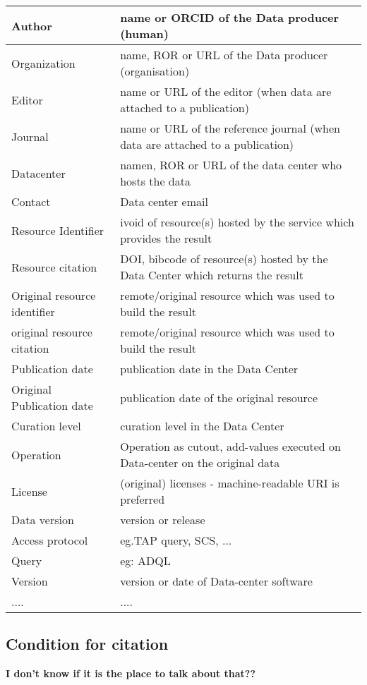 \documentclass[11pt,a4paper]{ivoa}
\begin{document}
\begin{tabular}{|l|p{}|} \hline
Author & name or ORCID of the Data producer (human)\\ \hline
Organization&  name, ROR or URL of the Data producer (organisation)\\ \hline
Editor & name or URL  of the editor (when data are attached to a publication)\\ \hline
Journal & name or URL of the reference journal (when data are attached to a publication)\\ \hline
Datacenter & namen, ROR or URL of the data center who hosts the data \\ \hline
Contact & Data center email \\ \hline

Resource Identifier & ivoid of resource(s) hosted by the service which provides the result \\ \hline
Resource citation & DOI, bibcode of resource(s) hosted by the Data Center which returns the result \\ \hline
Original resource identifier & remote/original resource which was used to build the result \\ \hline
original resource citation & remote/original resource which was used to build the result \\ \hline
Publication date & publication date in the Data Center \\ \hline
Original Publication date &  publication date of the original resource \\ \hline
Curation level & curation level in the Data Center \\ \hline
Operation & Operation as cutout, add-values executed on Data-center on the original data \\ \hline
License & (original) licenses - machine-readable URI is preferred\\ \hline
Data version & version or release\\ \hline
Access protocol &  eg.TAP query, SCS, ... \\ \hline
Query & eg: ADQL \\ \hline
Version & version or date of Data-center software\\ \hline
.... & .... \\ \hline
\end{tabular}


\subsection{Condition for citation}
\textbf{I don't know if it is the place to talk about that??}
\end{document}
